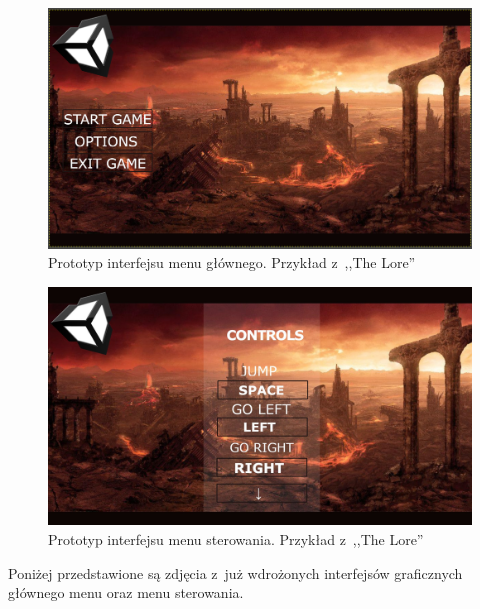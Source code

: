 \documentclass[oneside,polski,logo]{amuthesis}
\begin{document}
\begin{figure}[h]
	\centering
	\includegraphics[width=13cm]{images/hyps/proto.png}
	\caption{Prototyp interfejsu menu głównego. Przykład z~,,The Lore''}
\end{figure}
\newpage
\begin{figure}[ht!]
	\centering
	\includegraphics[width=13cm]{images/hyps/proto2.jpg}
	\caption{Prototyp interfejsu menu sterowania. Przykład z~,,The Lore''}
\end{figure}

Poniżej przedstawione są zdjęcia z~już wdrożonych interfejsów graficznych głównego menu oraz menu sterowania.
\end{document}
